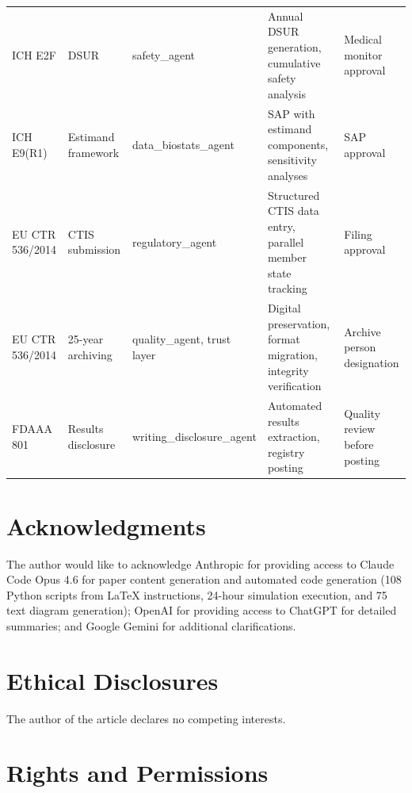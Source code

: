 \begin{longtable}{L{2.5cm} L{2.5cm} L{2.2cm} L{2.2cm} L{2.2cm}}
ICH E2F & DSUR & safety\_agent & Annual DSUR generation, cumulative safety analysis & Medical monitor approval \\
ICH E9(R1) & Estimand framework & data\_biostats\_agent & SAP with estimand components, sensitivity analyses & SAP approval \\
EU CTR 536/2014 & CTIS submission & regulatory\_agent & Structured CTIS data entry, parallel member state tracking & Filing approval \\
EU CTR 536/2014 & 25-year archiving & quality\_agent, trust layer & Digital preservation, format migration, integrity verification & Archive person designation \\
FDAAA 801 & Results disclosure & writing\_disclosure\_agent & Automated results extraction, registry posting & Quality review before posting \\
\end{longtable}

\section*{Acknowledgments}

The author would like to acknowledge Anthropic for providing access to Claude Code
Opus 4.6 for paper content generation and automated code generation (108 Python
scripts from LaTeX instructions, 24-hour simulation execution, and 75 text diagram
generation); OpenAI for providing access to ChatGPT for detailed summaries; and
Google Gemini for additional clarifications.

\section*{Ethical Disclosures}

The author of the article declares no competing interests.

\section*{Rights and Permissions}


